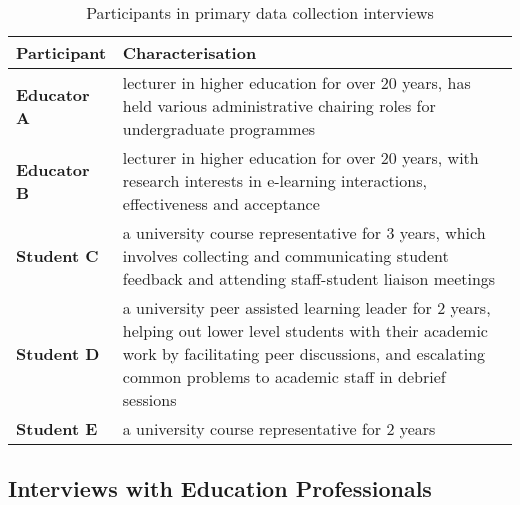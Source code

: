 \begin{table}[!h] 
    \caption{Participants in primary data collection interviews}
    \centering
    \label{table:participants-req}
    \begin{tabularx}{\textwidth}{>{\bfseries}lX}
        Participant & Characterisation\\
        \toprule
        Educator A & lecturer in higher education for over 20 years, has held various administrative 
        chairing roles for undergraduate programmes\\\midrule
        Educator B & lecturer in higher education for over 20 years, with research interests 
        in e-learning interactions, effectiveness and acceptance\\\midrule
        Student C & a university course representative for 3 years, which involves collecting and 
        communicating student feedback and attending staff-student liaison meetings \\\midrule
        Student D & a university peer assisted learning leader for 2 years, helping out lower level 
        students with their academic work by facilitating peer discussions, and escalating common problems
        to academic staff in debrief sessions\\\midrule
        Student E & a university course representative for 2 years\\\bottomrule
    \end{tabularx}
\end{table}

\subsection{Interviews with Education Professionals}

